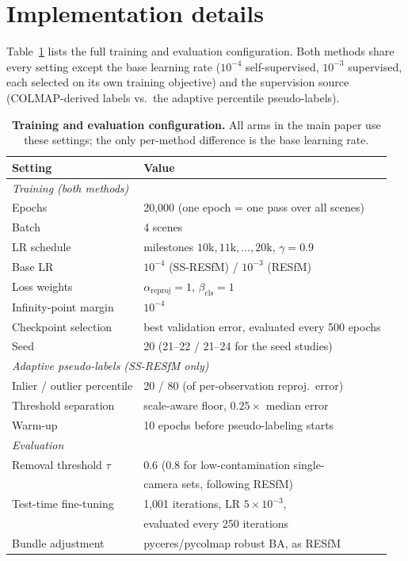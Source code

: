 \documentclass[10pt,twocolumn,letterpaper]{article}
\begin{document}
\section{Implementation details}\label{sec:impl}
Table~\ref{tab:supp_config} lists the full training and evaluation configuration. Both
methods share every setting except the base learning rate ($10^{-4}$ self-supervised,
$10^{-3}$ supervised, each selected on its own training objective) and the supervision
source (COLMAP-derived labels vs.\ the adaptive percentile pseudo-labels).



\clearpage
\onecolumn
\begin{table}[tb]\centering\footnotesize
\caption{\textbf{Training and evaluation configuration.} All arms in the main paper use
these settings; the only per-method difference is the base learning rate.}
\label{tab:supp_config}
\setlength{\tabcolsep}{4pt}%
\begin{tabular}{ll}
\toprule
Setting & Value\\
\midrule
\multicolumn{2}{l}{\emph{Training (both methods)}}\\
Epochs & 20{,}000 (one epoch = one pass over all scenes)\\
Batch & 4 scenes\\
LR schedule & milestones $10\text{k},11\text{k},\ldots,20\text{k}$, $\gamma=0.9$\\
Base LR & $10^{-4}$ (SS-RESfM) / $10^{-3}$ (RESfM)\\
Loss weights & $\alpha_{\text{reproj}}=1$, $\beta_{\text{cls}}=1$\\
Infinity-point margin & $10^{-4}$\\
Checkpoint selection & best validation error, evaluated every 500 epochs\\
Seed & 20 (21--22 / 21--24 for the seed studies)\\
\midrule
\multicolumn{2}{l}{\emph{Adaptive pseudo-labels (SS-RESfM only)}}\\
Inlier / outlier percentile & 20 / 80 (of per-observation reproj.\ error)\\
Threshold separation & scale-aware floor, $0.25\times$ median error\\
Warm-up & 10 epochs before pseudo-labeling starts\\
\midrule
\multicolumn{2}{l}{\emph{Evaluation}}\\
Removal threshold $\tau$ & 0.6 (0.8 for low-contamination single-\\
 & camera sets, following RESfM)\\
Test-time fine-tuning & 1{,}001 iterations, LR $5\times10^{-3}$,\\
 & evaluated every 250 iterations\\
Bundle adjustment & pyceres/pycolmap robust BA, as RESfM\\
\bottomrule
\end{tabular}
\end{table}
\end{document}
